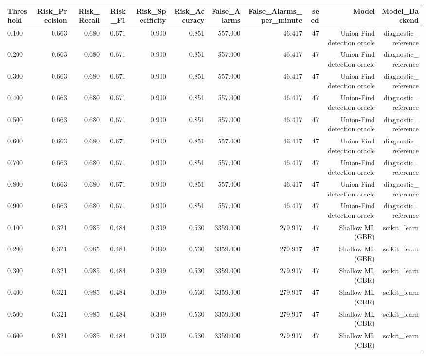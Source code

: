 \begin{tabular}{lrrrrrrrrrr}
\toprule
Threshold & Risk\_Precision & Risk\_Recall & Risk\_F1 & Risk\_Specificity & Risk\_Accuracy & False\_Alarms & False\_Alarms\_per\_minute & seed & Model & Model\_Backend \\
\midrule
0.100 & 0.663 & 0.680 & 0.671 & 0.900 & 0.851 & 557.000 & 46.417 & 47 & Union-Find detection oracle & diagnostic\_reference \\
0.200 & 0.663 & 0.680 & 0.671 & 0.900 & 0.851 & 557.000 & 46.417 & 47 & Union-Find detection oracle & diagnostic\_reference \\
0.300 & 0.663 & 0.680 & 0.671 & 0.900 & 0.851 & 557.000 & 46.417 & 47 & Union-Find detection oracle & diagnostic\_reference \\
0.400 & 0.663 & 0.680 & 0.671 & 0.900 & 0.851 & 557.000 & 46.417 & 47 & Union-Find detection oracle & diagnostic\_reference \\
0.500 & 0.663 & 0.680 & 0.671 & 0.900 & 0.851 & 557.000 & 46.417 & 47 & Union-Find detection oracle & diagnostic\_reference \\
0.600 & 0.663 & 0.680 & 0.671 & 0.900 & 0.851 & 557.000 & 46.417 & 47 & Union-Find detection oracle & diagnostic\_reference \\
0.700 & 0.663 & 0.680 & 0.671 & 0.900 & 0.851 & 557.000 & 46.417 & 47 & Union-Find detection oracle & diagnostic\_reference \\
0.800 & 0.663 & 0.680 & 0.671 & 0.900 & 0.851 & 557.000 & 46.417 & 47 & Union-Find detection oracle & diagnostic\_reference \\
0.900 & 0.663 & 0.680 & 0.671 & 0.900 & 0.851 & 557.000 & 46.417 & 47 & Union-Find detection oracle & diagnostic\_reference \\
0.100 & 0.321 & 0.985 & 0.484 & 0.399 & 0.530 & 3359.000 & 279.917 & 47 & Shallow ML (GBR) & scikit\_learn \\
0.200 & 0.321 & 0.985 & 0.484 & 0.399 & 0.530 & 3359.000 & 279.917 & 47 & Shallow ML (GBR) & scikit\_learn \\
0.300 & 0.321 & 0.985 & 0.484 & 0.399 & 0.530 & 3359.000 & 279.917 & 47 & Shallow ML (GBR) & scikit\_learn \\
0.400 & 0.321 & 0.985 & 0.484 & 0.399 & 0.530 & 3359.000 & 279.917 & 47 & Shallow ML (GBR) & scikit\_learn \\
0.500 & 0.321 & 0.985 & 0.484 & 0.399 & 0.530 & 3359.000 & 279.917 & 47 & Shallow ML (GBR) & scikit\_learn \\
0.600 & 0.321 & 0.985 & 0.484 & 0.399 & 0.530 & 3359.000 & 279.917 & 47 & Shallow ML (GBR) & scikit\_learn \\

\end{tabular}
